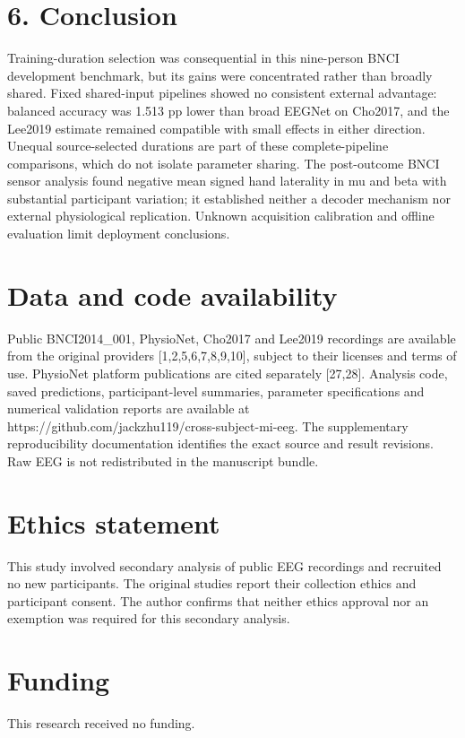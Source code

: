 \documentclass[11pt]{article}
\begin{document}
\section*{6. Conclusion}
Training-duration selection was consequential in this nine-person BNCI development benchmark, but its gains were concentrated rather than broadly shared. Fixed shared-input pipelines showed no consistent external advantage: balanced accuracy was 1.513 pp lower than broad EEGNet on Cho2017, and the Lee2019 estimate remained compatible with small effects in either direction. Unequal source-selected durations are part of these complete-pipeline comparisons, which do not isolate parameter sharing. The post-outcome BNCI sensor analysis found negative mean signed hand laterality in mu and beta with substantial participant variation; it established neither a decoder mechanism nor external physiological replication. Unknown acquisition calibration and offline evaluation limit deployment conclusions.

\section*{Data and code availability}
Public BNCI2014\_001, PhysioNet, Cho2017 and Lee2019 recordings are available from the original providers [1,2,5,6,7,8,9,10], subject to their licenses and terms of use. PhysioNet platform publications are cited separately [27,28]. Analysis code, saved predictions, participant-level summaries, parameter specifications and numerical validation reports are available at https://github.com/jackzhu119/cross-subject-mi-eeg. The supplementary reproducibility documentation identifies the exact source and result revisions. Raw EEG is not redistributed in the manuscript bundle.

\section*{Ethics statement}
This study involved secondary analysis of public EEG recordings and recruited no new participants. The original studies report their collection ethics and participant consent. The author confirms that neither ethics approval nor an exemption was required for this secondary analysis.

\section*{Funding}
This research received no funding.
\end{document}
